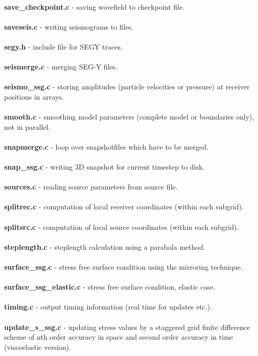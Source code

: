 \\
\textbf{save\_checkpoint.c} - saving wavefield to checkpoint file.\\
\\
\textbf{saveseis.c} - writing seismograms to files.\\
\\
\textbf{segy.h} - include file for SEGY traces.\\
\\
\textbf{seismerge.c} - merging SEG-Y files.\\
\\
\textbf{seismo\_ssg.c} - storing amplitudes (particle velocities or pressure) at receiver positions in arrays.\\
\\
\textbf{smooth.c} - smoothing model parameters (complete model or boundaries only), not in parallel.\\
\\
\textbf{snapmerge.c} - loop over snapshotfiles which have to be merged.\\
\\
\textbf{snap\_ssg.c} - writing 3D snapshot for current timestep to disk.\\
\\
\textbf{sources.c} - reading source parameters from  source file.\\
\\
\textbf{splitrec.c} - computation of local receiver coordinates (within each subgrid). \\
\\
\textbf{splitsrc.c} - computation of local source coordinates (within each subgrid).\\
\\
\textbf{steplength.c} - steplength calculation using a parabola method.\\
\\
\textbf{surface\_ssg.c} - stress free surface condition using the mirroring technique.\\
\\
\textbf{surface\_ssg\_elastic.c} - stress free surface condition, elastic case.\\
\\
\textbf{timing.c} - output timing information (real time for updates etc.).\\
\\
\textbf{update\_s\_ssg.c} - updating stress values by a staggered grid finite difference scheme of nth order accuracy in space and second order accuracy in time (viscoelastic version).\\
